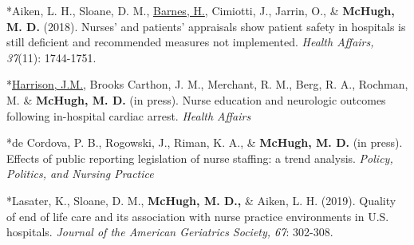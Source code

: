\documentclass[10pt,]{article}
\begin{document}
{{{{{{{{{{{{{{%


\begin{hangparas}{.25in}{1}

*Aiken, L. H., Sloane, D. M., {\underline {Barnes, H.}}, Cimiotti, J., Jarrin, O., \& {\textbf {McHugh, M. D.}} (2018). Nurses’ and patients’ appraisals show patient safety in hospitals is still deficient and recommended measures not implemented. {\textit {Health Affairs, 37}}(11): 1744-1751.

\end{hangparas}

\vspace{4mm}


\begin{hangparas}{.25in}{1}

*{\underline {Harrison, J.M.}}, Brooks Carthon, J. M., Merchant, R. M., Berg, R. A., Rochman, M. \& {\textbf {McHugh, M. D.}} (in press). Nurse education and neurologic outcomes following in-hospital cardiac arrest. {\textit {Health Affairs}}

\end{hangparas}

\vspace{4mm}

\begin{hangparas}{.25in}{1}

*de Cordova, P. B., Rogowski, J., Riman, K. A., \& {\textbf {McHugh, M. D.}} (in press). Effects of public reporting legislation of nurse staffing: a trend analysis. {\textit {Policy, Politics, and Nursing Practice}}

\end{hangparas}

\vspace{4mm}

\begin{hangparas}{.25in}{1}

*Lasater, K., Sloane, D. M., {\textbf {McHugh, M. D.,}} \& Aiken, L. H. (2019). Quality of end of life care and its association with nurse practice environments in U.S. hospitals. {\textit {Journal of the American Geriatrics Society, 67}}: 302-308.

\end{hangparas}

\vspace{4mm}

}}}}}}}}}}}}}}
\end{document}
